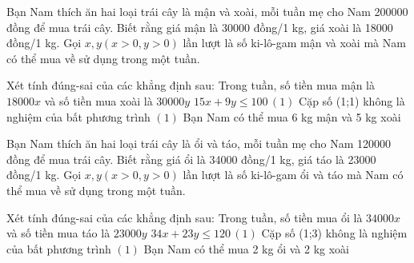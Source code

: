 \begin{ex}
 Bạn Nam thích ăn hai loại trái cây là mận và xoài, mỗi tuần mẹ cho Nam 200000 đồng để mua trái cây. Biết rằng giá mận là 30000 đồng/1 kg, giá xoài là 18000 đồng/1 kg. Gọi $x, y (x>0, y>0)$ lần lượt là số ki-lô-gam mận và xoài mà Nam có thể mua về sử dụng trong một tuần.

 Xét tính đúng-sai của các khẳng định sau:
\choiceTFt
{ Trong tuần, số tiền mua mận là ${18000x}$ và số tiền mua xoài là ${30000y}$ }
   { \True $15 x + 9 y\le 100 \, (1)$ }
     { Cặp số (1;1) không là nghiệm của bất phương trình $(1)$ }
    { Bạn Nam có thể mua 6 kg mận và 5 kg xoài }
\end{ex}

\begin{ex}
 Bạn Nam thích ăn hai loại trái cây là ổi và táo, mỗi tuần mẹ cho Nam 120000 đồng để mua trái cây. Biết rằng giá ổi là 34000 đồng/1 kg, giá táo là 23000 đồng/1 kg. Gọi $x, y (x>0, y>0)$ lần lượt là số ki-lô-gam ổi và táo mà Nam có thể mua về sử dụng trong một tuần.

 Xét tính đúng-sai của các khẳng định sau:
\choiceTFt
{ \True Trong tuần, số tiền mua ổi là ${34000x}$ và số tiền mua táo là ${23000y}$ }
   { \True $34 x + 23 y\le 120 \, (1)$ }
     { Cặp số (1;3) không là nghiệm của bất phương trình $(1)$ }
    { \True  Bạn Nam có thể mua 2 kg ổi và 2 kg xoài }
\end{ex}

